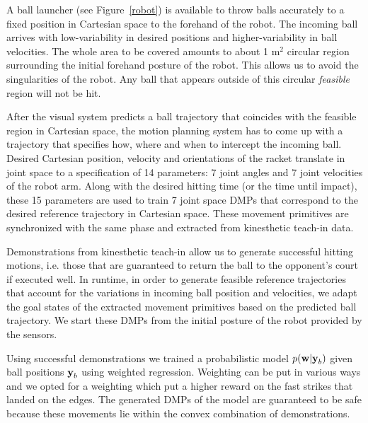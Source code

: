 A ball launcher (see Figure~\ref{robot}) is available to throw balls accurately to a fixed position in Cartesian space to the forehand of the robot. The incoming ball arrives with low-variability in desired positions and higher-variability in ball velocities. The whole area to be covered amounts to about 1 m$^2$ circular region surrounding the initial forehand posture of the robot. This allows us to avoid the singularities of the robot. Any ball that appears outside of this circular \emph{feasible} region will not be hit.

After the visual system predicts a ball trajectory that coincides with the feasible region in Cartesian space, the motion planning system has to come up with a trajectory that specifies how, where and when to intercept the incoming ball. Desired Cartesian position, velocity and orientations of the racket translate in joint space to a specification of 14 parameters: 7 joint angles and 7 joint velocities of the robot arm. Along with the desired hitting time (or the time until impact), these 15 parameters are used to train 7 joint space DMPs that correspond to the desired reference trajectory in Cartesian space. These movement primitives are synchronized with the same phase and extracted from kinesthetic teach-in data.

Demonstrations from kinesthetic teach-in allow us to generate successful hitting motions, i.e. those that are guaranteed to return the ball to the opponent's court if executed well. In runtime, in order to generate feasible reference trajectories that account for the variations in incoming ball position and velocities, we adapt the goal states of the extracted movement primitives based on the predicted ball trajectory. We start these DMPs from the initial posture of the robot provided by the sensors.

Using successful demonstrations we trained a probabilistic model $p(\boldsymbol{\mathrm{w}}|\boldsymbol{\mathrm{y}}_b)$ given ball positions $\boldsymbol{\mathrm{y}}_b$ using weighted regression. Weighting can be put in various ways and we opted for a weighting which put a higher reward on the fast strikes that landed on the edges. The generated DMPs of the model are guaranteed to be safe because these movements lie within the convex combination of demonstrations. 


